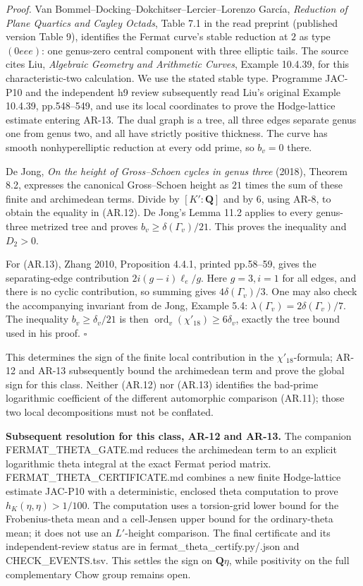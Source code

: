 \documentclass[11pt,a4paper]{article}
\begin{document}
\emph{Proof.} Van Bommel--Docking--Dokchitser--Lercier--Lorenzo García,
\emph{Reduction of Plane Quartics and Cayley Octads}, Table 7.1 in the
read preprint (published version Table 9), identifies the Fermat curve's
stable reduction at \(2\) as type \((0eee)\): one genus-zero central
component with three elliptic tails. The source cites Liu,
\emph{Algebraic Geometry and Arithmetic Curves}, Example 10.4.39, for
this characteristic-two calculation. We use the stated stable type.
Programme JAC-P10 and the independent h9 review subsequently read Liu's
original Example 10.4.39, pp.548--549, and use its local coordinates to
prove the Hodge-lattice estimate entering AR-13. The dual graph is a
tree, all three edges separate genus one from genus two, and all have
strictly positive thickness. The curve has smooth nonhyperelliptic
reduction at every odd prime, so \(b_v=0\) there.

De Jong, \emph{On the height of Gross--Schoen cycles in genus three}
(2018), Theorem 8.2, expresses the canonical Gross--Schoen height as
\(21\) times the sum of these finite and archimedean terms. Divide by
\([K':\mathbf Q]\) and by \(6\), using AR-8, to obtain the equality in
(AR.12). De Jong's Lemma 11.2 applies to every genus-three metrized tree
and proves \(b_v\ge\delta(\Gamma_v)/21\). This proves the inequality and
\(D_2>0\).

For (AR.13), Zhang 2010, Proposition 4.4.1, printed pp.58--59, gives the
separating-edge contribution \(2i(g-i)\ell_e/g\). Here \(g=3,i=1\) for
all edges, and there is no cyclic contribution, so summing gives
\(4\delta(\Gamma_v)/3\). One may also check the accompanying invariant
from de Jong, Example 5.4: \(\lambda(\Gamma_v)=2\delta(\Gamma_v)/7\).
The inequality \(b_v\ge\delta_v/21\) is then
\(\operatorname{ord}_v(\chi'_{18})\ge6\delta_v\), exactly the tree bound
used in his proof. \(\square\)

This determines the sign of the finite local contribution in the
\(\chi'_{18}\)-formula; AR-12 and AR-13 subsequently bound the
archimedean term and prove the global sign for this class. Neither
(AR.12) nor (AR.13) identifies the bad-prime logarithmic coefficient of
the different automorphic comparison (AR.11); those two local
decompositions must not be conflated.

\textbf{Subsequent resolution for this class, AR-12 and AR-13.} The
companion FERMAT\_THETA\_GATE.md reduces the archimedean term to an
explicit logarithmic theta integral at the exact Fermat period matrix.
FERMAT\_THETA\_CERTIFICATE.md combines a new finite Hodge-lattice
estimate JAC-P10 with a deterministic, enclosed theta computation to
prove \(h_K(\eta,\eta)>1/100\). The computation uses a torsion-grid
lower bound for the Frobenius-theta mean and a cell-Jensen upper bound
for the ordinary-theta mean; it does not use an \(L'\)-height
comparison. The final certificate and its independent-review status are
in fermat\_theta\_certify.py/.json and CHECK\_EVENTS.tsv. This settles
the sign on \(\mathbf Q\eta\), while positivity on the full
complementary Chow group remains open.
\end{document}

